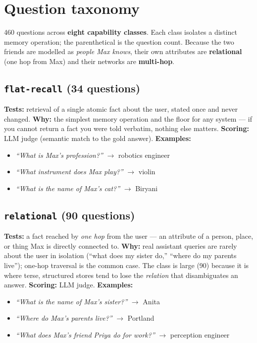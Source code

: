 \documentclass[11pt]{article}
\newcommand{\cat}[2]{\subsection{\texttt{#1} \normalfont\textmd{(#2)}}}
\begin{document}
\section{Question taxonomy}\label{sec:taxonomy}

460 questions across \textbf{eight capability classes}. Each class isolates a distinct memory operation; the
parenthetical is the question count. Because the two friends are modelled as \emph{people Max knows}, their own
attributes are \textbf{relational} (one hop from Max) and their networks are \textbf{multi-hop}.

\cat{flat-recall}{34 questions}
\textbf{Tests:} retrieval of a single atomic fact about the user, stated once and never changed.
\textbf{Why:} the simplest memory operation and the floor for any system --- if you cannot return a fact you
were told verbatim, nothing else matters. \textbf{Scoring:} LLM judge (semantic match to the gold answer).
\textbf{Examples:}
\begin{itemize}[nosep]
  \item \emph{``What is Max's profession?''} $\to$ robotics engineer
  \item \emph{``What instrument does Max play?''} $\to$ violin
  \item \emph{``What is the name of Max's cat?''} $\to$ Biryani
\end{itemize}

\cat{relational}{90 questions}
\textbf{Tests:} a fact reached by \emph{one hop} from the user --- an attribute of a person, place, or thing
Max is directly connected to. \textbf{Why:} real assistant queries are rarely about the user in isolation
(``what does my sister do,'' ``where do my parents live''); one-hop traversal is the common case. The class is
large (90) because it is where terse, structured stores tend to lose the \emph{relation} that disambiguates an
answer. \textbf{Scoring:} LLM judge. \textbf{Examples:}
\begin{itemize}[nosep]
  \item \emph{``What is the name of Max's sister?''} $\to$ Anita
  \item \emph{``Where do Max's parents live?''} $\to$ Portland
  \item \emph{``What does Max's friend Priya do for work?''} $\to$ perception engineer
\end{itemize}
\end{document}
